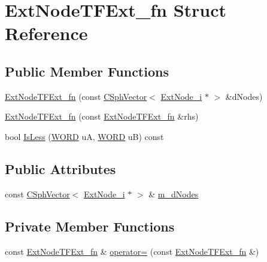 \hypertarget{structExtNodeTFExt__fn}{\section{Ext\-Node\-T\-F\-Ext\-\_\-fn Struct Reference}
\label{structExtNodeTFExt__fn}
}
\subsection*{Public Member Functions}
\begin{DoxyCompactItemize}
\item 
\hyperlink{structExtNodeTFExt__fn_a2e7122533c8d744ab2fdb61c7198aab7}{Ext\-Node\-T\-F\-Ext\-\_\-fn} (const \hyperlink{classCSphVector}{C\-Sph\-Vector}$<$ \hyperlink{classExtNode__i}{Ext\-Node\-\_\-i} $\ast$ $>$ \&d\-Nodes)
\item 
\hyperlink{structExtNodeTFExt__fn_a3b0d4e2fb0338493d28938f4e36db886}{Ext\-Node\-T\-F\-Ext\-\_\-fn} (const \hyperlink{structExtNodeTFExt__fn}{Ext\-Node\-T\-F\-Ext\-\_\-fn} \&rhs)
\item 
bool \hyperlink{structExtNodeTFExt__fn_a49a1319bb6bfc288de689d4022377148}{Is\-Less} (\hyperlink{sphinxstd_8h_a197942eefa7db30960ae396d68339b97}{W\-O\-R\-D} u\-A, \hyperlink{sphinxstd_8h_a197942eefa7db30960ae396d68339b97}{W\-O\-R\-D} u\-B) const 
\end{DoxyCompactItemize}
\subsection*{Public Attributes}
\begin{DoxyCompactItemize}
\item 
const \hyperlink{classCSphVector}{C\-Sph\-Vector}$<$ \hyperlink{classExtNode__i}{Ext\-Node\-\_\-i} $\ast$ $>$ \& \hyperlink{structExtNodeTFExt__fn_a64ba93d5a7d3a19c7cbfeb1e9a23ca7e}{m\-\_\-d\-Nodes}
\end{DoxyCompactItemize}
\subsection*{Private Member Functions}
\begin{DoxyCompactItemize}
\item 
const \hyperlink{structExtNodeTFExt__fn}{Ext\-Node\-T\-F\-Ext\-\_\-fn} \& \hyperlink{structExtNodeTFExt__fn_aaa9933750dcf876a83b0be13eb72442b}{operator=} (const \hyperlink{structExtNodeTFExt__fn}{Ext\-Node\-T\-F\-Ext\-\_\-fn} \&)
\end{DoxyCompactItemize}


